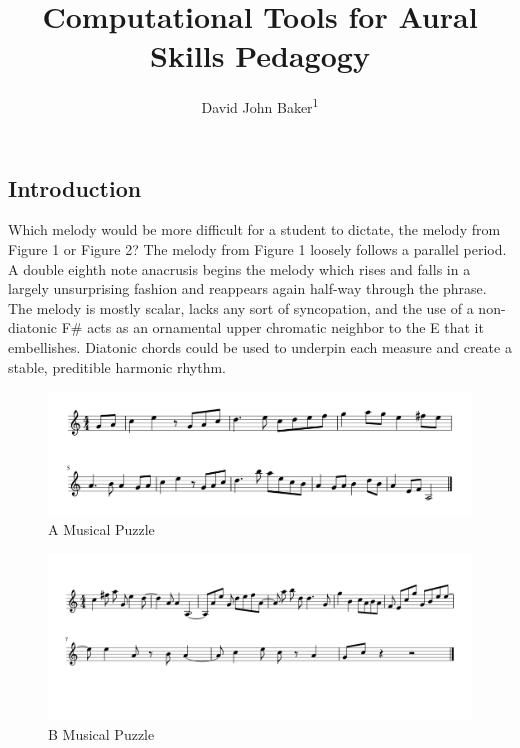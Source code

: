 \documentclass[english,man,floatsintext]{apa6}
\author{David John Baker\textsuperscript{1}}
\affiliation{
\vspace{0.5cm}
\textsuperscript{1} Louisiana State University}
\title{Computational Tools for Aural Skills Pedagogy}
\date{}
\begin{document}
\maketitle

\hypertarget{introduction}{%
\subsection{Introduction}\label{introduction}}

Which melody would be more difficult for a student to dictate, the melody from Figure 1 or Figure 2?
The melody from Figure 1 loosely follows a parallel period.
A double eighth note anacrusis begins the melody which rises and falls in a largely unsurprising fashion and reappears again half-way through the phrase.
The melody is mostly scalar, lacks any sort of syncopation, and the use of a non-diatonic F\# acts as an ornamental upper chromatic neighbor to the E that it embellishes.
Diatonic chords could be used to underpin each measure and create a stable, preditible harmonic rhythm.

\begin{figure}
\includegraphics[width=1\linewidth]{../figures/musical_puzzles/musical_puzzle_a} \caption{A Musical Puzzle}\label{fig:unnamed-chunk-1}
\end{figure}

\begin{figure}
\includegraphics[width=1\linewidth]{../figures/musical_puzzles/musical_puzzle_b} \caption{B Musical Puzzle}\label{fig:unnamed-chunk-2}
\end{figure}
\end{document}
